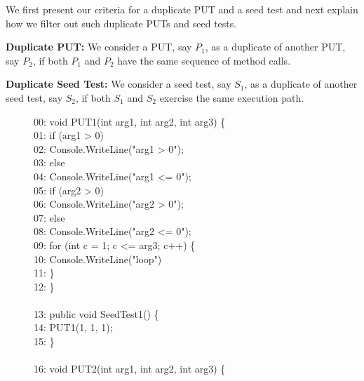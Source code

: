 We first present our criteria for a duplicate PUT and a seed test and next explain
how we filter out such duplicate PUTs and seed tests.

\textbf{Duplicate PUT:} We consider a PUT, say $P_1$, as a duplicate
of another PUT, say $P_2$, if both $P_1$ and $P_2$ have the same sequence of method calls. 

\textbf{Duplicate Seed Test:} We consider a seed test, say $S_1$, as a duplicate of 
another seed test, say $S_2$, if both $S_1$ and $S_2$ exercise the same execution path.

\begin{figure}[t]
\begin{CodeOut}
00: void PUT1(int arg1, int arg2, int arg3) \{\\
01: \hspace*{0.2in}if (arg1 > 0)\\
02: \hspace*{0.4in}Console.WriteLine("arg1 > 0"); \\
03: \hspace*{0.2in}else\\
04: \hspace*{0.4in}Console.WriteLine("arg1 <= 0"); \\
05: \hspace*{0.2in}if (arg2 > 0)\\
06: \hspace*{0.4in}Console.WriteLine("arg2 > 0"); \\
07: \hspace*{0.2in}else\\
08: \hspace*{0.4in}Console.WriteLine("arg2 <= 0"); \\
09: \hspace*{0.2in}for (int c = 1; c <= arg3; c++)  \{ \\
10: \hspace*{0.4in}Console.WriteLine("loop") \\
11: \hspace*{0.2in}\}\\
12: \}\\
\\
13: public void SeedTest1() \{\\
14: \hspace*{0.2in}PUT1(1, 1, 1);\\
15: \}\\
\\
16: void PUT2(int arg1, int arg2, int arg3) \{\\

\end{CodeOut}
\end{figure}
